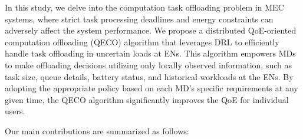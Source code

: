 \documentclass[12pt,draftclsnofoot,onecolumn]{IEEEtran}
\begin{document}
In this study, we delve into the computation task offloading problem in MEC systems, where strict task processing deadlines and energy constraints can adversely affect the system performance. We propose a distributed QoE-oriented computation offloading (QECO) algorithm that leverages DRL to efficiently handle task offloading in uncertain loads at ENs. This algorithm empowers MDs to make offloading decisions utilizing only locally observed information, such as task size, queue details, battery status, and historical workloads at the ENs. By adopting the appropriate policy based on each MD’s specific requirements at any given time, the QECO algorithm significantly improves the QoE for individual users.




Our main contributions are summarized as follows:
\end{document}
